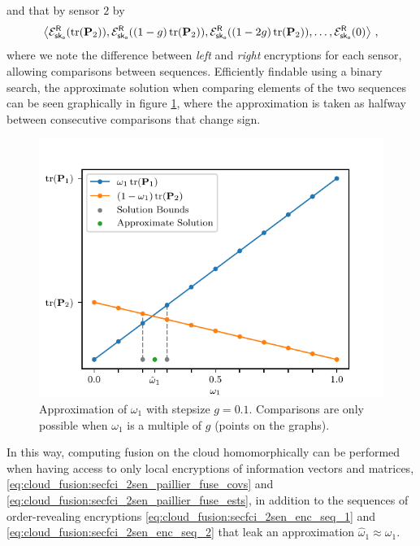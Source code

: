 and that by sensor $2$ by
\begin{equation}\label{eq:cloud_fusion:secfci_2sen_enc_seq_2}
    \left\langle\mathcal{E}^{\mathsf{R}}_{\mathsf{sk}_{\mathsf{o}}}(\operatorname{tr}({{\mathbf{P}}}_2)), \mathcal{E}^{\mathsf{R}}_{\mathsf{sk}_{\mathsf{o}}}((1-g)\operatorname{tr}({{\mathbf{P}}}_2)), \mathcal{E}^{\mathsf{R}}_{\mathsf{sk}_{\mathsf{o}}}((1-2g)\operatorname{tr}({{\mathbf{P}}}_2)),\dots,\mathcal{E}^{\mathsf{R}}_{\mathsf{sk}_{\mathsf{o}}}(0)\right\rangle\,,
\end{equation}
where we note the difference between \textit{left} and \textit{right} encryptions for each sensor, allowing comparisons between sequences. Efficiently findable using a binary search, the approximate solution when comparing elements of the two sequences can be seen graphically in figure \ref{fig:cloud_fusion:secfci_2sen_intersect}, where the approximation is taken as halfway between consecutive comparisons that change sign.
\begin{figure}[htbp]
    \begin{center}
       \includegraphics{figures/cloud_fusion_secfci_2sen_intersect.pdf}
    \end{center}
    \caption{Approximation of $\omega_1$ with stepsize $g=0.1$. Comparisons are only possible when $\omega_1$ is a multiple of $g$ (points on the graphs).}
    \label{fig:cloud_fusion:secfci_2sen_intersect}
 \end{figure}

In this way, computing fusion on the cloud homomorphically can be performed when having access to only local encryptions of information vectors and matrices, \eqref{eq:cloud_fusion:secfci_2sen_paillier_fuse_covs} and \eqref{eq:cloud_fusion:secfci_2sen_paillier_fuse_ests}, in addition to the sequences of order-revealing encryptions \eqref{eq:cloud_fusion:secfci_2sen_enc_seq_1} and \eqref{eq:cloud_fusion:secfci_2sen_enc_seq_2} that leak an approximation $\hat{\omega}_1 \approx \omega_1$.


